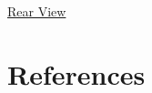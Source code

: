 \documentclass[final,3p, review, times]{Elsevier/elsarticle}
\begin{document}
\\\\\\\\\\\\\\\\\\\\\\\\\\\\\\\\\\\\\\\\\\\\\\\\\\\\
\centerline{\underline{\Large{Rear View}}}






 
\section*{References}


\end{document}
